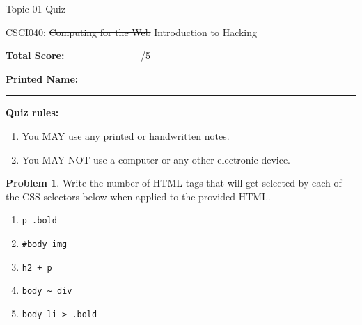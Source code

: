 \documentclass[10pt]{article}
\theoremstyle{definition}
\newtheorem{problem}{Problem}
\begin{document}
\begin{center}
    {
\Large
Topic 01 Quiz
}

    \vspace{0.1in}
    CSCI040: \sout{Computing for the Web} Introduction to Hacking

    \vspace{0.1in}
\end{center}

\vspace{0.15in}
\noindent
\textbf{Total Score:} ~~~~~~~~~~~~~~~/5

\vspace{0.5in}
\noindent
\textbf{Printed Name:}

\noindent
\rule{\textwidth}{0.1pt}
\vspace{0.25in}

\noindent
\textbf{Quiz rules:}
\begin{enumerate}
    \item You MAY use any printed or handwritten notes.
    \item You MAY NOT use a computer or any other electronic device.
\end{enumerate}


\vspace{0.15in}

\noindent
\begin{problem}
    Write the number of HTML tags that will get selected by each of the CSS selectors below when applied to the provided HTML.

\begin{enumerate}[before=\setlength{\baselineskip}{8mm}]
    \item
    \lstinline{p .bold}

    \item
    \lstinline{#body img}

    \item
    \lstinline{h2 + p}

    \item
    \lstinline{body ~ div}

    \item
    \lstinline{body li > .bold}
\end{enumerate}
\end{problem}
\end{document}
